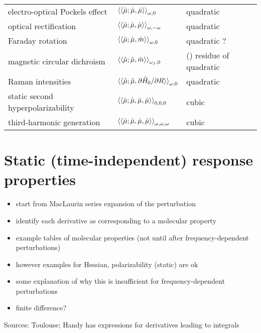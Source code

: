 \documentclass[%
class = book,%
crop = false,%
float = true,%
multi = true,%
preview = false,%
]{standalone}
\begin{document}
\begin{table}
\begin{tabular}{lll}
    electro-optical Pockels effect    & \( \braket{\braket{\hat{\mu};\hat{\mu},\hat{\mu}}}_{\omega,0} \)                       & quadratic \\
    optical rectification             & \( \braket{\braket{\hat{\mu};\hat{\mu},\hat{\mu}}}_{\omega,-\omega} \)                 & quadratic \\
    Faraday rotation                  & \( \braket{\braket{\hat{\mu};\hat{\mu},\hat{m}}}_{\omega,0} \)                         & quadratic ? \\
    magnetic circular dichroism       & \( \braket{\braket{\hat{\mu};\hat{\mu},\hat{m}}}_{\omega_{f},0} \)                     & () residue of quadratic \\
    Raman intensities                 & \( \braket{\braket{\hat{\mu};\hat{\mu},\partial\hat{H}_{0}/\partial R}}_{\omega,0} \)  & quadratic \\
    \midrule
    static second hyperpolarizability & \( \braket{\braket{\hat{\mu};\hat{\mu},\hat{\mu},\hat{\mu}}}_{0,0,0} \)                & cubic \\
    third-harmonic generation         & \( \braket{\braket{\hat{\mu};\hat{\mu},\hat{\mu},\hat{\mu}}}_{\omega,\omega,\omega} \) & cubic \\
    \bottomrule
  \end{tabular}
\end{table}

\section{Static (time-independent) response properties}

\begin{itemize}
\item start from MacLaurin series expansion of the perturbation
\item identify each derivative as corresponding to a molecular property
\item example tables of molecular properties (not until after frequency-dependent perturbations)
\item however examples for Hessian, polarizability (static) are ok
\item some explanation of why this is insufficient for frequency-dependent perturbations
\item finite difference?
\end{itemize}

Sources: Toulouse; Handy has expressions for derivatives leading to integrals
\end{document}
